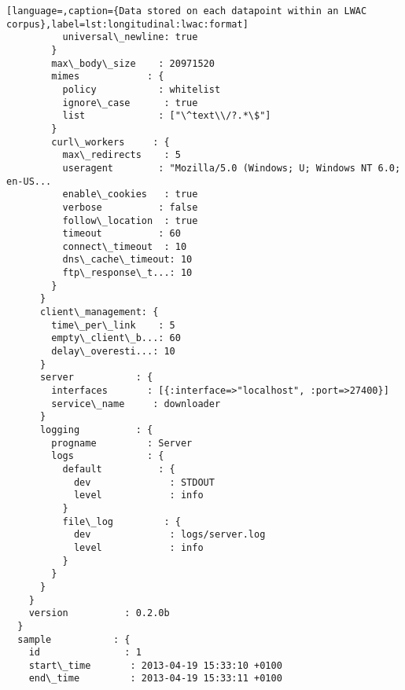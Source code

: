 \begin{lstlisting}[language=,caption={Data stored on each datapoint within an LWAC corpus},label=lst:longitudinal:lwac:format]
          universal\_newline: true                                              
        }
        max\_body\_size    : 20971520                                          
        mimes            : {
          policy           : whitelist                                         
          ignore\_case      : true                                              
          list             : ["\^text\\/?.*\$"]                                  
        }
        curl\_workers     : {
          max\_redirects    : 5                                                 
          useragent        : "Mozilla/5.0 (Windows; U; Windows NT 6.0; en-US...
          enable\_cookies   : true                                              
          verbose          : false                                             
          follow\_location  : true                                              
          timeout          : 60                                                
          connect\_timeout  : 10                                                
          dns\_cache\_timeout: 10                                                
          ftp\_response\_t...: 10                                                
        }
      }
      client\_management: {
        time\_per\_link    : 5                                                 
        empty\_client\_b...: 60                                                
        delay\_overesti...: 10                                                
      }
      server           : {
        interfaces       : [{:interface=>"localhost", :port=>27400}]         
        service\_name     : downloader                                        
      }
      logging          : {
        progname         : Server                                            
        logs             : {
          default          : {
            dev              : STDOUT                                            
            level            : info                                              
          }
          file\_log         : {
            dev              : logs/server.log                                   
            level            : info                                              
          }
        }
      }
    }
    version          : 0.2.0b                                            
  }
  sample           : {
    id               : 1                                                 
    start\_time       : 2013-04-19 15:33:10 +0100                         
    end\_time         : 2013-04-19 15:33:11 +0100                         

\end{lstlisting}
